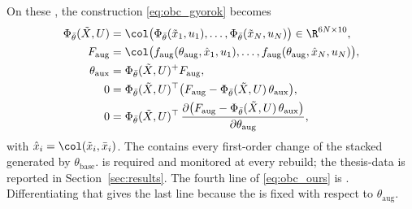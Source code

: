On these , the construction \eqref{eq:obc_gyorok} becomes
\begin{equation}
\begin{aligned}
 \Phi_{\bar\theta}(\tilde X,U)
 &=\col\bigl(\Phi_{\bar\theta}(\tilde x_1,u_1),\dots,
   \Phi_{\bar\theta}(\tilde x_N,u_N)\bigr)\in\R^{6N\times10},\\
 F_{\mathrm{aug}}
 &=\col\bigl(f_{\mathrm{aug}}(\theta_{\mathrm{aug}},\hat x_1,u_1),\dots,
   f_{\mathrm{aug}}(\theta_{\mathrm{aug}},\hat x_N,u_N)\bigr),\\
 \theta_{\mathrm{aux}}&=\Phi_{\bar\theta}(\tilde X,U)^{+}F_{\mathrm{aug}},\\
 0&=\Phi_{\bar\theta}(\tilde X,U)^\top
   \bigl(F_{\mathrm{aug}}-\Phi_{\bar\theta}(\tilde X,U)\,\theta_{\mathrm{aux}}\bigr),\\
 0&=\Phi_{\bar\theta}(\tilde X,U)^\top\,
   \frac{\partial\bigl(F_{\mathrm{aug}}-\Phi_{\bar\theta}(\tilde X,U)\,
   \theta_{\mathrm{aux}}\bigr)}{\partial\theta_{\mathrm{aug}}},
\end{aligned}
\label{eq:obc_ours}
\end{equation}
with $\hat x_i=\col(\tilde x_i,\bar x_i)$.
The  contains every first-order change of the stacked  generated by $\theta_{\mathrm{base}}$.  is required
and monitored at every rebuild; the thesis-data  is reported in
Section~\ref{sec:results}. The fourth line of \eqref{eq:obc_ours} is
\cite[Lemma~3]{gyorok2026obc}. Differentiating that  gives the
last line because the  is fixed with respect to
$\theta_{\mathrm{aug}}$.

